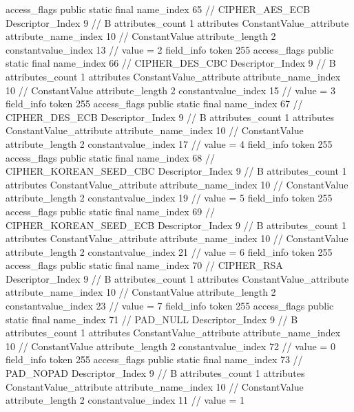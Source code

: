 {{{{{				access_flags	public static final
				name_index	65		// CIPHER_AES_ECB
				Descriptor_Index	9		// B
				attributes_count	1
				attributes {
				ConstantValue_attribute {
					attribute_name_index	10		// ConstantValue
					attribute_length	2
					constantvalue_index	13		// value = 2
				}
				}
			}
			field_info {
				token	255
				access_flags	public static final
				name_index	66		// CIPHER_DES_CBC
				Descriptor_Index	9		// B
				attributes_count	1
				attributes {
				ConstantValue_attribute {
					attribute_name_index	10		// ConstantValue
					attribute_length	2
					constantvalue_index	15		// value = 3
				}
				}
			}
			field_info {
				token	255
				access_flags	public static final
				name_index	67		// CIPHER_DES_ECB
				Descriptor_Index	9		// B
				attributes_count	1
				attributes {
				ConstantValue_attribute {
					attribute_name_index	10		// ConstantValue
					attribute_length	2
					constantvalue_index	17		// value = 4
				}
				}
			}
			field_info {
				token	255
				access_flags	public static final
				name_index	68		// CIPHER_KOREAN_SEED_CBC
				Descriptor_Index	9		// B
				attributes_count	1
				attributes {
				ConstantValue_attribute {
					attribute_name_index	10		// ConstantValue
					attribute_length	2
					constantvalue_index	19		// value = 5
				}
				}
			}
			field_info {
				token	255
				access_flags	public static final
				name_index	69		// CIPHER_KOREAN_SEED_ECB
				Descriptor_Index	9		// B
				attributes_count	1
				attributes {
				ConstantValue_attribute {
					attribute_name_index	10		// ConstantValue
					attribute_length	2
					constantvalue_index	21		// value = 6
				}
				}
			}
			field_info {
				token	255
				access_flags	public static final
				name_index	70		// CIPHER_RSA
				Descriptor_Index	9		// B
				attributes_count	1
				attributes {
				ConstantValue_attribute {
					attribute_name_index	10		// ConstantValue
					attribute_length	2
					constantvalue_index	23		// value = 7
				}
				}
			}
			field_info {
				token	255
				access_flags	public static final
				name_index	71		// PAD_NULL
				Descriptor_Index	9		// B
				attributes_count	1
				attributes {
				ConstantValue_attribute {
					attribute_name_index	10		// ConstantValue
					attribute_length	2
					constantvalue_index	72		// value = 0
				}
				}
			}
			field_info {
				token	255
				access_flags	public static final
				name_index	73		// PAD_NOPAD
				Descriptor_Index	9		// B
				attributes_count	1
				attributes {
				ConstantValue_attribute {
					attribute_name_index	10		// ConstantValue
					attribute_length	2
					constantvalue_index	11		// value = 1
}}}}}}}
